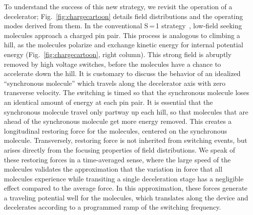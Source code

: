 \documentclass[%
 reprint,
 amsmath,amssymb,
 aps,
prl,
]{revtex4-1}
\begin{document}
To understand the success of this new strategy, we revisit the operation of a decelerator; Fig.~\ref{fig:chargecartoon} details field distributions and the operating modes derived from them.
In the conventional S\,=\,1 strategy~\cite{VanDeMeerakker2012}, low-field seeking molecules approach a charged pin pair. 
This process is analogous to climbing a hill, as the molecules polarize and exchange kinetic energy for internal potential energy (Fig.~\ref{fig:chargecartoon}, right column).
This strong field is abruptly removed by high voltage switches, before the molecules have a chance to accelerate down the hill.
It is customary to discuss the behavior of an idealized ``synchronous molecule'' which travels along the decelerator axis with zero transverse velocity.
The switching is timed so that the synchronous molecule loses an identical amount of energy at each pin pair.
It is essential that the synchronous molecule travel only partway up each hill, so that molecules that are ahead of the synchronous molecule get more energy removed.
This creates a longitudinal restoring force for the molecules, centered on the synchronous molecule.
Transversely, restoring force is not inherited from switching events, but arises directly from the focusing properties of field distributions.
We speak of these restoring forces in a time-averaged sense, where the large speed of the molecules validates the approximation that the variation in force that all molecules experience while transiting a single deceleration stage has a negligible effect compared to the average force.
In this approximation, these forces generate a traveling potential well for the molecules, which translates along the device and decelerates according to a programmed ramp of the switching frequency.
\end{document}
